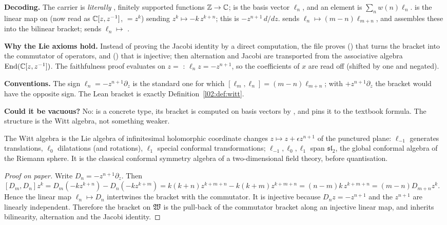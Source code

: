 \begin{dictionary}
\textbf{Decoding.} The carrier  is \emph{literally} , finitely supported
functions ${\mathbb{Z}}\to{\mathbb{C}}$;  is the basis vector $\ell_n$, and an element
 is $\sum_n w(n)\ell_n$.  is the linear map on  (now read as
${\mathbb{C}}[z,z^{-1}]$,  $= z^k$) sending $z^k\mapsto -k\,z^{k+n}$; this is
$-z^{n+1}\,d/dz$.  sends $\ell_n\mapsto (m-n)\ell_{m+n}$, and 
assembles these into the bilinear bracket;  sends $\ell_n\mapsto$ .

\textbf{Why the Lie axioms hold.} Instead of proving the Jacobi identity by a direct computation,
the file proves () that  turns the bracket into the commutator of
operators, and () that  is injective; then alternation and Jacobi are
transported from the associative algebra $\operatorname{End}({\mathbb{C}}[z,z^{-1}])$. The faithfulness proof evaluates
 on $z = $ : $\ell_n z = -z^{n+1}$, so the coefficients of $x$ are read
off (shifted by one and negated).

\textbf{Conventions.} The sign $\ell_n = -z^{n+1}\partial_z$ is the standard one for which
$[\ell_m,\ell_n] = (m-n)\ell_{m+n}$; with $+z^{n+1}\partial_z$ the bracket would have the opposite
sign. The Lean bracket  is exactly Definition~\ref{l02:def:witt}.

\textbf{Could it be vacuous?} No:  is a concrete type, its bracket is computed on basis
vectors by , and  pins it to the textbook formula. The
structure is the Witt algebra, not something weaker.
\end{dictionary}

\begin{physics}
The Witt algebra is the Lie algebra of infinitesimal holomorphic coordinate changes
$z\mapsto z + \epsilon z^{n+1}$ of the punctured plane: $\ell_{-1}$ generates translations, $\ell_0$
dilatations (and rotations), $\ell_1$ special conformal transformations; $\ell_{-1},\ell_0,\ell_1$
span $\mathfrak{sl}_2$, the global conformal algebra of the Riemann sphere. It is the classical
conformal symmetry algebra of a two-dimensional field theory, before quantisation.
\end{physics}

\begin{proof}[Proof on paper]
Write $D_n = -z^{n+1}\partial_z$. Then $[D_m,D_n]z^k = D_m(-kz^{k+n}) - D_n(-kz^{k+m}) =
k(k+n)z^{k+m+n} - k(k+m)z^{k+m+n} = (n-m)k\,z^{k+m+n} = (m-n)D_{m+n}z^k$. Hence the linear map
$\ell_n\mapsto D_n$ intertwines the bracket with the commutator. It is injective because
$D_n z = -z^{n+1}$ and the $z^{n+1}$ are linearly independent. Therefore the bracket on
$\mathfrak{W}$ is the pull-back of the commutator bracket along an injective linear map, and inherits
bilinearity, alternation and the Jacobi identity.
\end{proof}

